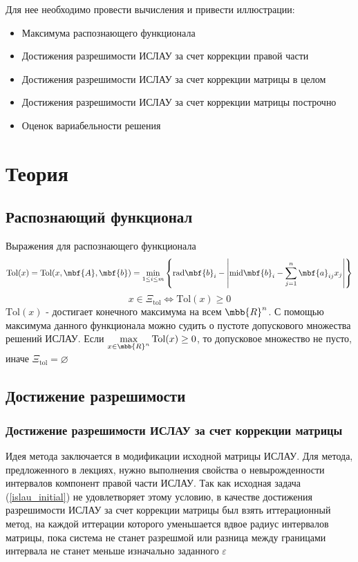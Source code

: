 \documentclass[12pt,a4paper]{article}
\begin{document}
        Для нее необходимо провести вычисления и привести иллюстрации:
        \begin{itemize}
            \item Максимума распознающего функционала
            \item Достижения разрешимости ИСЛАУ за счет коррекции правой части
            \item Достижения разрешимости ИСЛАУ за счет коррекции матрицы в целом
            \item Достижения разрешимости ИСЛАУ за счет коррекции матрицы построчно
            \item Оценок вариабельности решения
        \end{itemize}
    
    \section{Теория}
        \subsection{Распознающий функционал}
            Выражения для распознающего функционала 
            \begin{equation*}
                \mathrm{Tol}(x)=\mathrm{Tol}(x,\mbf{A},\mbf{b})=\min_{1\leq i\leq m}\left\{\text{rad}{\mbf{b}_i}-\left|\text{mid}{\mbf{b}_i}-\sum_{j=1}^n \mbf{a}_{ij}x_j\right|\right\}
            \end{equation*}
            \begin{equation*}
                x\in\Xi_{\mathrm{tol}}\Leftrightarrow\mathrm{Tol}(x)\geq0
            \end{equation*}
            $\mathrm{Tol}(x)$ - достигает конечного максимума на всем $\mbb{R}^n$. С помощью максимума данного функционала можно судить о пустоте допускового множества решений ИСЛАУ. Если $\max\limits_{x\in\mbb{R}^n}\mathrm{Tol}(x)\geq0$, то допусковое множество не пусто, иначе $\Xi_{\mathrm{tol}}=\varnothing$
        
        
        \subsection{Достижение разрешимости}
        
            \subsubsection{Достижение разрешимости ИСЛАУ за счет коррекции матрицы}
                Идея метода заключается в модификации исходной матрицы ИСЛАУ. Для метода, предложенного в лекциях, нужно выполнения свойства о невырожденности интервалов компонент правой части ИСЛАУ. Так как исходная задача (\ref{islau_initial}) не удовлетворяет этому условию, в качестве достижения разрешимости ИСЛАУ за счет коррекции матрицы был взять иттерационный метод, на каждой иттерации которого уменьшается вдвое радиус интервалов матрицы, пока система не станет разрешмой или разница между границами интервала не станет меньше изначально заданного $\varepsilon$
        
\end{document}

